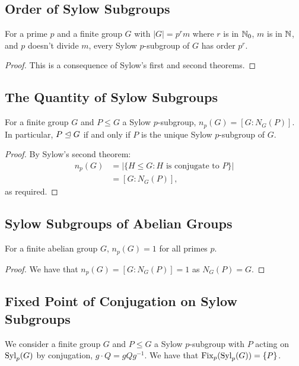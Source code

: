 \subsection{Order of Sylow Subgroups}  \label{6.7}

For a prime $p$ and a finite group $G$ with $|G| = p^rm$
where $r$ is in $\mathbb{N}_0$, $m$ is in $\mathbb{N}$, and 
$p$ doesn't divide $m$, every Sylow $p$-subgroup of $G$
has order $p^r$. 
\begin{proof}
    This is a consequence of Sylow's first and second theorems.
\end{proof}

\subsection{The Quantity of Sylow Subgroups} \label{6.8}

For a finite group $G$ and $P \leq G$ a Sylow $p$-subgroup,
$n_p(G) = [G : N_G(P)]$. In particular, $P \trianglelefteq G$ if and
only if $P$ is the unique Sylow $p$-subgroup of $G$.

\begin{proof}
    By Sylow's second theorem: \begin{align*}
        n_p(G) &= |\{H \leq G : H \text{ is conjugate to } P\}| \\
        &= [G : N_G(P)],
    \end{align*} as required.
\end{proof}

\subsection{Sylow Subgroups of Abelian Groups} \label{6.9}

For a finite abelian group $G$, $n_p(G) = 1$ for all primes $p$.

\begin{proof}
    We have that $n_p(G) = [G : N_G(P)] = 1$ as $N_G(P) = G$.
\end{proof}

\subsection{Fixed Point of Conjugation on Sylow Subgroups} \label{6.11}

We consider a finite group $G$ and $P \leq G$ a Sylow $p$-subgroup
with $P$ acting on $\operatorname{Syl}_p(G)$ by conjugation,
$g \cdot Q = gQg^{-1}$. We have that $\operatorname{Fix}_p(\operatorname{Syl}_p(G)) = \{P\}$.


